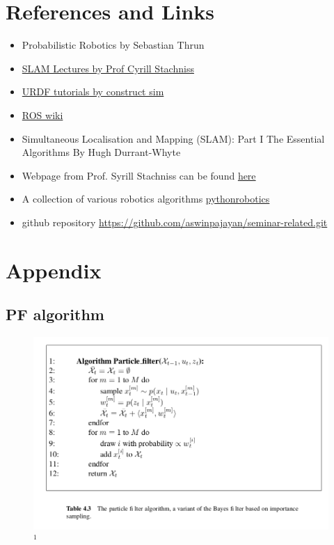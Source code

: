\documentclass{article}
\begin{document}
\section{References and Links}
\begin{itemize}
\item Probabilistic Robotics by Sebastian Thrun
\item \href{https://www.youtube.com/playlist?list=PLgnQpQtFTOGQrZ4O5QzbIHgl3b1JHimN\_}{SLAM Lectures by Prof Cyrill Stachniss}
\item \href{https://www.theconstructsim.com/ros-projects-exploring-ros-using-2-wheeled-robot-part-1/}{URDF tutorials by construct sim}
\item \href{http://wiki.ros.org/ROS/Tutorials}{ROS wiki}
\item Simultaneous Localisation and Mapping (SLAM): Part I The Essential Algorithms By Hugh Durrant-Whyte
\item Webpage from  Prof. Syrill Stachniss can be found \href{http://ais.informatik.uni-freiburg.de/teaching/ws13/mapping/}{here}\\
\item A collection of various robotics algorithms    \href{https://pythonrobotics.readthedocs.io}{pythonrobotics}

\item github repository \url{https://github.com/aswinpajayan/seminar-related.git}
\end{itemize}

\section{Appendix}
\subsection{PF algorithm}


    \begin{figure}
        \centering
        \includegraphics[width=\textwidth]{./PF.png}$^{1}$
    \end{figure}
\end{document}

